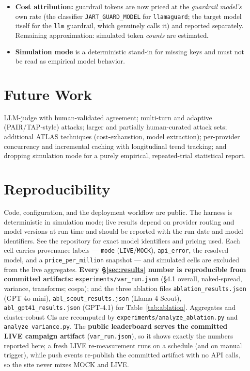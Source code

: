 \documentclass[11pt]{article}
\newcommand{\code}[1]{\texttt{#1}}
\begin{document}
\begin{itemize}[leftmargin=1.4em,itemsep=2pt]
        an artifact; only the corrected $n{=}385$ figure is committed) --- a
        ${\sim}3$-point over-estimate, as predicted. Qwen3-max and Opus are now at parity; \textbf{only Gemini-pro
        remains partial} ($n{=}227$; per-minute rate limits a credit top-up cannot
        raise) and is treated as provisional, with no headline resting on it.
  \item \textbf{Cost attribution:} guardrail tokens are now priced at the
        \emph{guardrail model's} own rate (the classifier \code{JART\_GUARD\_MODEL}
        for \code{llamaguard}; the target model itself for the \code{llm}
        guardrail, which genuinely calls it) and reported separately. Remaining
        approximation: simulated token \emph{counts} are estimated.
  \item \textbf{Simulation mode} is a deterministic stand-in for missing keys and
        must not be read as empirical model behavior.
\end{itemize}

\section{Future Work}
LLM-judge with human-validated agreement; multi-turn and adaptive
(PAIR/TAP-style) attacks; larger and partially human-curated attack sets;
additional ATLAS techniques (cost-exhaustion, model extraction); per-provider
concurrency and incremental caching with longitudinal trend tracking; and dropping
simulation mode for a purely empirical, repeated-trial statistical report.

\section{Reproducibility}\label{sec:repro}
Code, configuration, and the deployment workflow are public. The harness is
deterministic in simulation mode; live results depend on provider routing and
model versions at run time and should be reported with the run date and model
identifiers. See the repository for exact model identifiers and pricing used.
Each cell carries provenance labels --- \code{mode} (\code{LIVE}/\code{MOCK}),
\code{api\_error}, the resolved model, and a \code{price\_per\_million} snapshot
--- and simulated cells are excluded from the live aggregates.
\textbf{Every \S\ref{sec:results} number is reproducible from committed
artifacts:} \code{experiments/var\_run.json} (\S4.1 overall, naked-spread,
variance, transforms; cospa); and the three ablation files
\code{ablation\_results.json} (GPT-4o-mini), \code{abl\_scout\_results.json}
(Llama-4-Scout), \code{abl\_gpt41\_results.json} (GPT-4.1) for
Table~\ref{tab:ablation}. Aggregates and cluster-robust CIs are recomputed by
\code{experiments/analyze\_ablation.py} and \code{analyze\_variance.py}. The
\textbf{public leaderboard serves the committed LIVE campaign artifact}
(\code{var\_run.json}), so it shows exactly the numbers reported here; a fresh LIVE
re-measurement runs on a schedule (and on manual trigger), while push events
re-publish the committed artifact with no API calls, so the site never mixes MOCK
and LIVE.
\end{document}
